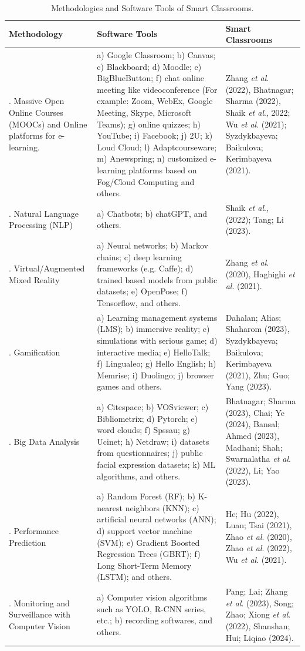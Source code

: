 \documentclass[english]{textolivre}
\begin{document}
\clearpage
\begin{longtable}{@{}
>{\raggedright\arraybackslash}p{} 
>{\raggedright\arraybackslash}p{} 
>{\raggedright\arraybackslash}p{} 
@{}}
\caption{Methodologies and Software Tools of Smart Classrooms.}
\label{tab03}
\\
\toprule 
Methodology & Software Tools & Smart Classrooms \\
\midrule
1. Massive Open Online Courses (MOOCs) and Online platforms for
e-learning. & a) Google Classroom; b) Canvas; c) Blackboard; d) Moodle;
e) BigBlueButton; f) chat online meeting like videoconference (For
example: Zoom, WebEx, Google Meeting, Skype, Microsoft Teams); g) online
quizzes; h) YouTube; i) Facebook; j) 2U; k) Loud Cloud; l)
Adaptcourseware; m) Anewspring; n) customized e-learning platforms based
on Fog/Cloud Computing and others. & Zhang \emph{et al}. (2022),
Bhatnagar; Sharma (2022), Shaik \emph{et al}., 2022; Wu \emph{et al}.
(2021); Syzdykbayeva; Baikulova; Kerimbayeva (2021). \\
2. Natural Language Processing (NLP) & a) Chatbots; b) chatGPT, and
others. & Shaik \emph{et al}., (2022); Tang; Li (2023). \\
3. Virtual/Augmented Mixed Reality & a) Neural networks; b) Markov
chains; c) deep learning frameworks (e.g. Caffe); d) trained based
models from public datasets; e) OpenPose; f) Tensorflow, and others. &
Zhang \emph{et al}. (2020), Haghighi \emph{et al}. (2021). \\
4. Gamification & a) Learning management systems (LMS); b) immersive
reality; c) simulations with serious game; d) interactive media; e)
HelloTalk; f) Lingualeo; g) Hello English; h) Memrise; i) Duolingo; j)
browser games and others. & Dahalan; Alias; Shaharom (2023),
Syzdykbayeva; Baikulova; Kerimbayeva (2021), Zhu; Guo; Yang (2023). \\
5. Big Data Analysis & a) Citespace; b) VOSviewer; c) Bibliometrix; d)
Pytorch; e) word clouds; f) Spssau; g) Ucinet; h) Netdraw; i) datasets
from questionnaires; j) public facial expression datasets; k) ML
algorithms, and others. & Bhatnagar; Sharma (2023), Chai; Ye (2024),
Bansal; Ahmed (2023), Madhani; Shah; Swarnalatha \emph{et al}. (2022),
Li; Yao (2023). \\
6. Performance Prediction & a) Random Forest (RF); b) K-nearest
neighbors (KNN); c) artificial neural networks (ANN); d) support vector
machine (SVM); e) Gradient Boosted Regression Trees (GBRT); f) Long
Short-Term Memory (LSTM); and others. & He; Hu (2022), Luan; Tsai
(2021), Zhao \emph{et al}. (2020), Zhao \emph{et al}. (2022), Wu
\emph{et al}. (2021). \\
7. Monitoring and Surveillance with Computer Vision & a) Computer vision
algorithms such as YOLO, R-CNN series, etc.; b) recording softwares, and
others. & Pang; Lai; Zhang \emph{et al}. (2023), Song; Zhao; Xiong
\emph{et al}. (2022), Shanshan; Hui; Liqiao (2024). \\
\bottomrule
\end{longtable}
\end{document}
